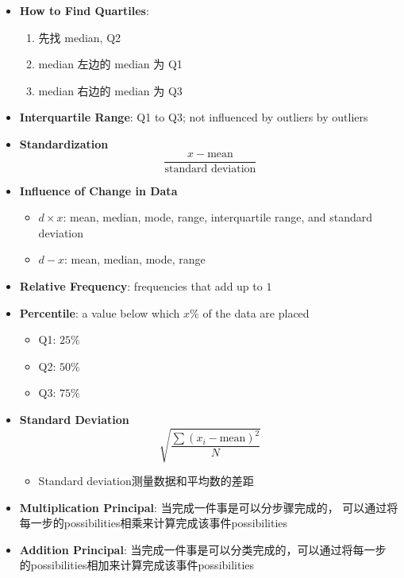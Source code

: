 \begin{multicols}{2}
\begin{itemize}
    \item \textbf{How to Find Quartiles}:
    \begin{enumerate}
      \item 先找 median, Q2
      \item median 左边的 median 为 Q1
      \item median 右边的 median 为 Q3
    \end{enumerate}

    \item \textbf{Interquartile Range}: Q1 to Q3; not influenced by outliers
    by outliers

    \item \textbf{Standardization}
    \begin{equation}
      \frac{x - \text{mean}}{\text{standard deviation}}
    \end{equation}

    \item \textbf{Influence of Change in Data}
    \begin{itemize}
      \item $ d \times x $: mean, median, mode, range, interquartile range,
      and standard deviation
      \item $ d - x $: mean, median, mode, range
    \end{itemize}

    \item \textbf{Relative Frequency}: frequencies that add up to $ 1 $
    \item \textbf{Percentile}: a value below which $ x \% $ of the data are
    placed
    \begin{itemize}
      \item Q1: $ 25\% $
      \item Q2: $ 50\% $
      \item Q3: $ 75\% $
    \end{itemize}

    \item \textbf{Standard Deviation}
    \begin{equation}
      \sqrt{\frac{\sum \left( x_{i} - \text{mean} \right)^{2}}{N}}
    \end{equation}
    \begin{itemize}
      \item Standard deviation测量数据和平均数的差距
    \end{itemize}

    \item \textbf{Multiplication Principal}: 当完成一件事是可以分步骤完成的，
    可以通过将每一步的possibilities相乘来计算完成该事件possibilities
    \item \textbf{Addition Principal}: 当完成一件事是可以分类完成的，可以通过将每一步
    的possibilities相加来计算完成该事件possibilities


\end{itemize}
\end{multicols}
